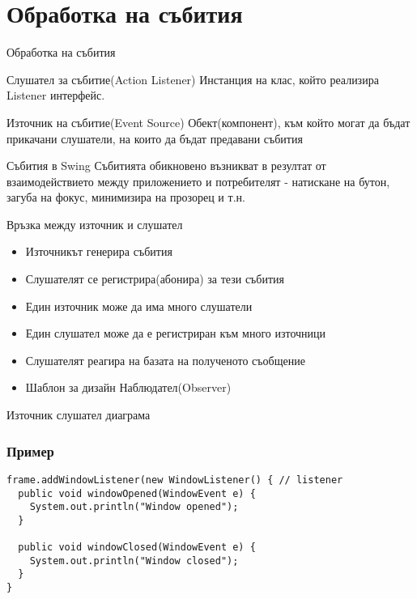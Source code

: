 \documentclass{beamer}
\begin{document}
\section{Обработка на събития}

\begin{frame}{Обработка на събития}
  \transdissolve
  \begin{block}{Слушател за събитие(Action Listener)}
    Инстанция на клас, който реализира Listener интерфейс.
  \end{block}
  \begin{block}{Източник на събитие(Event Source)}
    Обект(компонент), към който могат да бъдат прикачани слушатели, на
    които да бъдат предавани събития
  \end{block}
  \begin{block}{Събития в Swing}
    Събитията обикновено възникват в резултат от взаимодействието
    между приложението и потребителят - натискане на бутон, загуба на
    фокус, минимизира на прозорец и т.н.
  \end{block}
\end{frame}

\begin{frame}{Връзка между източник и слушател}
  \transdissolve
  \begin{itemize}
  \item Източникът генерира събития
  \item Слушателят се регистрира(абонира) за тези събития
  \item Един източник може да има много слушатели
  \item Един слушател може да е регистриран към много източници
  \item Слушателят реагира на базата на полученото съобщение
  \item Шаблон за дизайн Наблюдател(Observer)
  \end{itemize}
\end{frame}


\begin{frame}{Източник слушател диаграма}
  \transdissolve
  
\end{frame}

\begin{frame}[fragile]
  \frametitle{Пример}
  \transdissolve
\begin{lstlisting}
frame.addWindowListener(new WindowListener() { // listener
  public void windowOpened(WindowEvent e) {
    System.out.println("Window opened"); 
  }
  
  public void windowClosed(WindowEvent e) {
    System.out.println("Window closed"); 
  }
}

\end{lstlisting}
\end{frame}
\end{document}
